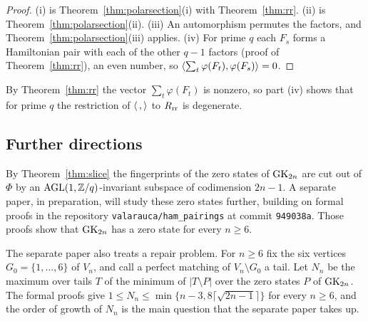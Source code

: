 \begin{proof}
(i) is Theorem~\ref{thm:polarsection}(i) with Theorem~\ref{thm:rr}. (ii) is Theorem~\ref{thm:polarsection}(ii). (iii) An automorphism permutes the factors, and Theorem~\ref{thm:polarsection}(iii) applies. (iv) For prime $q$ each $F_s$ forms a Hamiltonian pair with each of the other $q-1$ factors (proof of Theorem~\ref{thm:rr}), an even number, so $\langle\sum_t\varphi(F_t),\varphi(F_s)\rangle=0$.
\end{proof}

By Theorem~\ref{thm:rr} the vector $\sum_t\varphi(F_t)$ is nonzero, so part (iv) shows that for prime $q$ the restriction of $\langle\,,\rangle$ to $R_{\mathrm{rr}}$ is degenerate.

\subsection{Further directions}\label{subsec:further}

By Theorem~\ref{thm:slice} the fingerprints of the zero states of $\mathrm{GK}_{2n}$ are cut out of $\Phi$ by an $\operatorname{AGL}(1,\mathbb{Z}/q)$-invariant subspace of codimension $2n-1$. A separate paper, in preparation, will study these zero states further, building on formal proofs in the repository \texttt{valarauca/ham\_pairings} at commit \texttt{949038a}. Those proofs show that $\mathrm{GK}_{2n}$ has a zero state for every $n\ge6$.

The separate paper also treats a repair problem. For $n\ge6$ fix the six vertices $G_0=\{1,\dots,6\}$ of $V_n$, and call a perfect matching of $V_n\setminus G_0$ a tail. Let $N_n$ be the maximum over tails $T$ of the minimum of $|T\setminus P|$ over the zero states $P$ of $\mathrm{GK}_{2n}$. The formal proofs give $1\le N_n\le\min\{n-3,8\lceil\sqrt{2n-1}\rceil\}$ for every $n\ge6$, and the order of growth of $N_n$ is the main question that the separate paper takes up.

